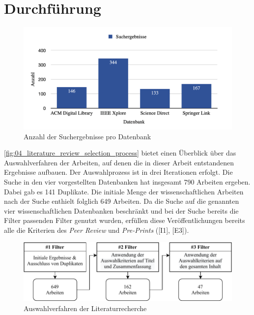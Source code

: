 \section{Durchführung}


\begin{figure}
    \centering
    \includegraphics[width=0.75\linewidth]{contents/04_literature_review/res/database_results.png}
    \caption{Anzahl der Suchergebnisse pro Datenbank}
    \label{fig:04_literature_review_screening_process}
\end{figure}

\autoref{fig:04_literature_review_selection_process} bietet einen Überblick über das Auswahlverfahren der Arbeiten, auf denen die in dieser Arbeit entstandenen Ergebnisse aufbauen. Der Auswahlprozess ist in drei Iterationen erfolgt. Die Suche in den vier vorgestellten Datenbanken hat insgesamt 790 Arbeiten ergeben. Dabei gab es 141 Duplikate. Die initiale Menge der wissenschaftlichen Arbeiten nach der Suche enthielt folglich 649 Arbeiten. Da die Suche auf die genannten vier wissenschaftlichen Datenbanken beschränkt und bei der Suche bereits die Filter passenden Filter genutzt wurden, erfüllen diese Veröffentlichungen bereits alle die Kriterien des \textit{Peer Review} und \textit{Pre-Prints} ([I1], [E3]).

\begin{figure}
    \centering
    \includegraphics{contents/04_literature_review/res/selection_process.pdf}
    \caption{Auswahlverfahren der Literaturrecherche}
    \label{fig:04_literature_review_selection_process}
\end{figure}